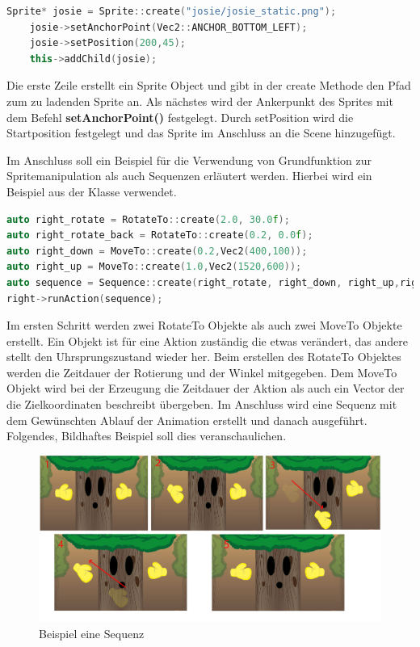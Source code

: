 \begin{lstlisting}[label=lst:sprite_ancerpoint,
				   language=C++,
				   firstnumber=54,
				   caption=Sprite laden ( TutorialScene.cpp )]
Sprite* josie = Sprite::create("josie/josie_static.png");
	josie->setAnchorPoint(Vec2::ANCHOR_BOTTOM_LEFT);
	josie->setPosition(200,45);
	this->addChild(josie);
\end{lstlisting}

Die erste Zeile erstellt ein Sprite Object und gibt in der create Methode den Pfad zum zu ladenden Sprite an. Als nächstes wird der Ankerpunkt des Sprites mit dem Befehl \textbf{setAnchorPoint()} festgelegt. Durch setPosition wird die Startposition festgelegt und das Sprite im Anschluss an die Scene hinzugefügt. 


Im Anschluss soll ein Beispiel für die Verwendung von Grundfunktion zur Spritemanipulation als auch Sequenzen erläutert werden. Hierbei wird ein Beispiel aus der Klasse  verwendet.

\begin{lstlisting}[label=lst:boss_attack_sequence,
				   language=C++,
				   firstnumber=219,
				   caption=Sequence erstellen ( BossLevel.cpp )]
auto right_rotate = RotateTo::create(2.0, 30.0f);
auto right_rotate_back = RotateTo::create(0.2, 0.0f);
auto right_down = MoveTo::create(0.2,Vec2(400,100));
auto right_up = MoveTo::create(1.0,Vec2(1520,600));
auto sequence = Sequence::create(right_rotate, right_down, right_up,right_rotate_back, nullptr);
right->runAction(sequence);
\end{lstlisting}

Im ersten Schritt werden zwei RotateTo Objekte als auch zwei MoveTo Objekte erstellt. Ein Objekt ist für eine Aktion zuständig die etwas verändert, das andere stellt den Uhrsprungszustand wieder her. Beim erstellen des RotateTo Objektes werden die Zeitdauer der Rotierung und der Winkel mitgegeben. Dem MoveTo Objekt wird bei der Erzeugung die Zeitdauer der Aktion als auch ein Vector der die Zielkoordinaten beschreibt übergeben. Im Anschluss wird eine Sequenz mit dem Gewünschten Ablauf der Animation erstellt und danach ausgeführt. Folgendes, Bildhaftes Beispiel soll dies veranschaulichen. 

\begin{figure}[H]
  \centering
  \includegraphics[width=15.5cm]{resources/dokubaum}
  \caption{Beispiel eine Sequenz}
  \label{fig:dokubaum} 
\end{figure}

